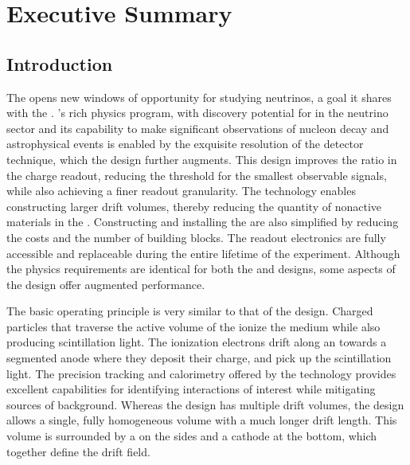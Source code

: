 \chapter{Executive Summary}
\label{ch:dp-execsum}



\section{Introduction}
\label{sec:dp-execsum-introduction}


The    opens new windows of opportunity for studying neutrinos, a goal it shares with the  . 
 's rich physics program, with discovery potential for  in the neutrino sector and its capability to make significant observations of nucleon decay and astrophysical events is enabled by the exquisite resolution of the  detector technique, which the  design further augments. This design improves the  ratio in the charge readout, reducing the threshold for the smallest observable signals, while also achieving a finer readout granularity.  The  technology enables constructing larger drift volumes, thereby reducing  the quantity of nonactive materials in the . Constructing and installing the  are also simplified by reducing the costs and the number of  building blocks. The readout electronics are fully accessible and replaceable during the entire lifetime of the experiment. Although the physics requirements are identical for both the  and  designs, some aspects of the  design offer augmented performance. 

The basic operating principle is very similar to that of the  design.  Charged particles that traverse the active volume of the  ionize the medium while also producing scintillation light.  The ionization electrons drift along an \efield towards a segmented anode where they deposit their charge, and  pick up the scintillation light. The precision tracking and calorimetry offered by the  technology provides excellent capabilities for identifying interactions of interest while mitigating sources of background.  Whereas the  design has multiple drift volumes, the  design allows a single, fully homogeneous  volume with a much longer drift length. This volume is surrounded by a  on the sides and a cathode at the bottom, which together define the drift field. 

